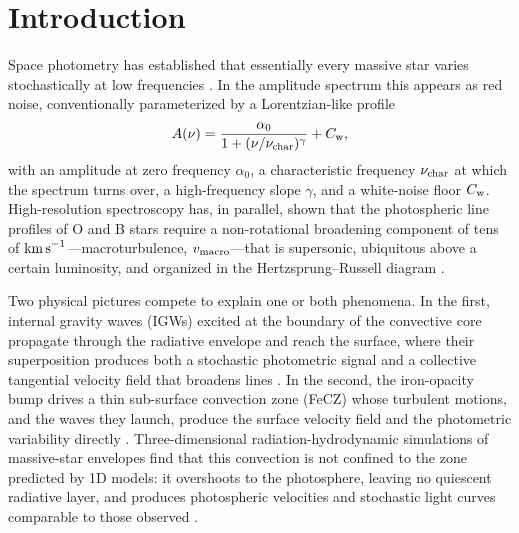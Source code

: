 \documentclass[twocolumn]{aastex631}
\newcommand{\vmac}{v_{\rm macro}}
\newcommand{\nuchar}{\nu_{\rm char}}
\newcommand{\kms}{{\rm km\,s}^{-1}}
\begin{document}

\section{Introduction}\label{sec:intro}

Space photometry has established that essentially every massive star varies stochastically at low frequencies \citep{bowman2019a,bowman2019b,bowman2020,burssens2020,bowman2023}. In the amplitude spectrum this appears as red noise, conventionally parameterized by a Lorentzian-like profile
\begin{equation}
A(\nu)=\frac{\alpha_0}{1+(\nu/\nuchar)^{\gamma}}+C_{\rm w},
\label{eq:lor}
\end{equation}
with an amplitude at zero frequency $\alpha_0$, a characteristic frequency $\nuchar$ at which the spectrum turns over, a high-frequency slope $\gamma$, and a white-noise floor $C_{\rm w}$. High-resolution spectroscopy has, in parallel, shown that the photospheric line profiles of O and B stars require a non-rotational broadening component of tens of $\kms$---macroturbulence, $\vmac$---that is supersonic, ubiquitous above a certain luminosity, and organized in the Hertzsprung--Russell diagram \citep{simondiaz2010,simondiaz2014,simondiaz2017}.

Two physical pictures compete to explain one or both phenomena. In the first, internal gravity waves (IGWs) excited at the boundary of the convective core propagate through the radiative envelope and reach the surface, where their superposition produces both a stochastic photometric signal \citep{rogers2013,aerts2015,edelmann2019,ratnasingam2020} and a collective tangential velocity field that broadens lines \citep{aerts2009}. In the second, the iron-opacity bump drives a thin sub-surface convection zone (FeCZ) whose turbulent motions, and the waves they launch, produce the surface velocity field and the photometric variability directly \citep{cantiello2009,grassitelli2015,cantiello2021,schultz2022,jermyn2022}. Three-dimensional radiation-hydrodynamic simulations of massive-star envelopes find that this convection is not confined to the zone predicted by 1D models: it overshoots to the photosphere, leaving no quiescent radiative layer, and produces photospheric velocities and stochastic light curves comparable to those observed \citep{jiang2015,jiang2018,schultz2022,schultz2023,ma2026}.
\end{document}

